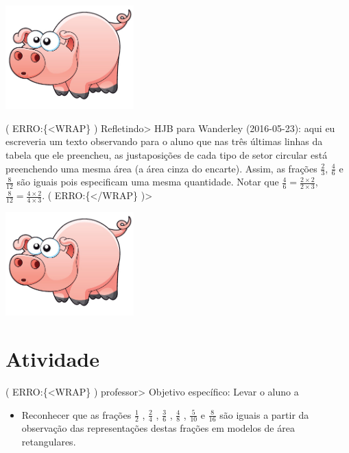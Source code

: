 \documentclass[a4,12pt]{book}
\begin{document}
\includegraphics[width=\textwidth,height=4cm, keepaspectratio]{pig}


( ERRO:\{<WRAP\} ) Refletindo>
HJB para Wanderley (2016-05-23): aqui eu escreveria um texto observando para o aluno que nas três últimas linhas da tabela que ele preencheu, as justaposições de cada tipo de setor circular está preenchendo uma mesma área (a área cinza do encarte). Assim, as frações $\frac{2}{3}$, $\frac{4}{6}$ e $\frac{8}{12}$ são iguais pois especificam uma mesma quantidade. Notar que
$\frac{4}{6} = \frac{2 \times 2}{2 \times 3}$, $\frac{8}{12} = \frac{4 \times 2}{4 \times 3}$.
( ERRO:\{</WRAP\} )>

\includegraphics[width=\textwidth,height=4cm, keepaspectratio]{pig}
\section{Atividade}




( ERRO:\{<WRAP\} ) professor>
Objetivo específico: Levar o aluno a
\begin{itemize} %
  \item     Reconhecer que as frações     $\frac{1}{2}$    ,     $\frac{2}{4}$    ,     $\frac{3}{6}$    ,     $\frac{4}{8}$    ,     $\frac{5}{10}$     e     $\frac{8}{16}$     são iguais a partir da observação das representações destas frações em modelos de área retangulares. 
\end{itemize} %
\end{document}
